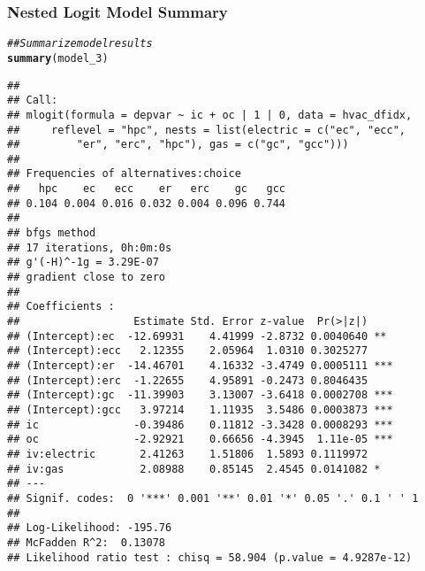 \documentclass{beamer}\usepackage[]{graphicx}\usepackage[]{xcolor}
\makeatletter
\newcommand{\hlcom}[1]{\textcolor[rgb]{0.678,0.584,0.686}{\textit{#1}}}%
\newcommand{\hlstd}[1]{\textcolor[rgb]{0.345,0.345,0.345}{#1}}%
\newcommand{\hlkwd}[1]{\textcolor[rgb]{0.737,0.353,0.396}{\textbf{#1}}}%
\newenvironment{kframe}{%
 \def\at@end@of@kframe{}%
 \ifinner\ifhmode%
  \def\at@end@of@kframe{\end{minipage}}%
  \begin{minipage}{\columnwidth}%
 \fi\fi%
 \def\FrameCommand##1{\hskip\@totalleftmargin \hskip-\fboxsep
 \colorbox{shadecolor}{##1}\hskip-\fboxsep
     \hskip-\linewidth \hskip-\@totalleftmargin \hskip\columnwidth}%
 \MakeFramed {\advance\hsize-\width
   \@totalleftmargin\z@ \linewidth\hsize
   \@setminipage}}%
 {\par\unskip\endMakeFramed%
 \at@end@of@kframe}
\newenvironment{knitrout}{}{} %
\makeatother
\begin{document}
\begin{frame}[fragile]\frametitle{Nested Logit Model Summary}
    \vspace{1ex}
\begin{knitrout}\tiny
{}\color{fgcolor}\begin{kframe}
\begin{alltt}
\hlcom{## Summarize model results}
\hlkwd{summary}\hlstd{(model_3)}
\end{alltt}
\begin{verbatim}
## 
## Call:
## mlogit(formula = depvar ~ ic + oc | 1 | 0, data = hvac_dfidx, 
##     reflevel = "hpc", nests = list(electric = c("ec", "ecc", 
##         "er", "erc", "hpc"), gas = c("gc", "gcc")))
## 
## Frequencies of alternatives:choice
##   hpc    ec   ecc    er   erc    gc   gcc 
## 0.104 0.004 0.016 0.032 0.004 0.096 0.744 
## 
## bfgs method
## 17 iterations, 0h:0m:0s 
## g'(-H)^-1g = 3.29E-07 
## gradient close to zero 
## 
## Coefficients :
##                  Estimate Std. Error z-value  Pr(>|z|)    
## (Intercept):ec  -12.69931    4.41999 -2.8732 0.0040640 ** 
## (Intercept):ecc   2.12355    2.05964  1.0310 0.3025277    
## (Intercept):er  -14.46701    4.16332 -3.4749 0.0005111 ***
## (Intercept):erc  -1.22655    4.95891 -0.2473 0.8046435    
## (Intercept):gc  -11.39903    3.13007 -3.6418 0.0002708 ***
## (Intercept):gcc   3.97214    1.11935  3.5486 0.0003873 ***
## ic               -0.39486    0.11812 -3.3428 0.0008293 ***
## oc               -2.92921    0.66656 -4.3945  1.11e-05 ***
## iv:electric       2.41263    1.51806  1.5893 0.1119972    
## iv:gas            2.08988    0.85145  2.4545 0.0141082 *  
## ---
## Signif. codes:  0 '***' 0.001 '**' 0.01 '*' 0.05 '.' 0.1 ' ' 1
## 
## Log-Likelihood: -195.76
## McFadden R^2:  0.13078 
## Likelihood ratio test : chisq = 58.904 (p.value = 4.9287e-12)
\end{verbatim}
\end{kframe}
\end{knitrout}
\end{frame}
\end{document}
